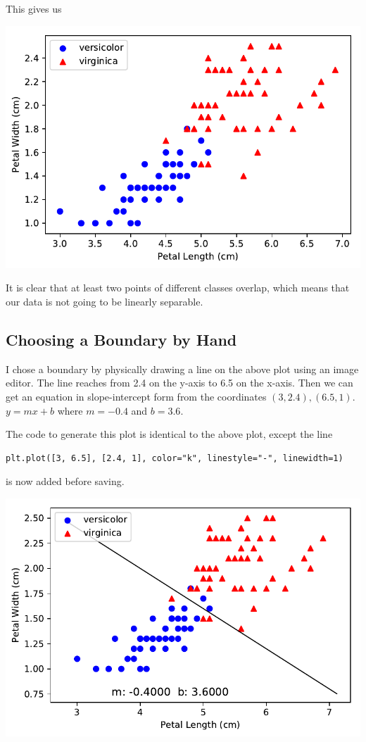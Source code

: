 \documentclass[letterpaper]{article}
\begin{document}
This gives us
\begin{center}
\includegraphics{plot_1a.pdf}
\end{center}
It is clear that at least two points of different classes overlap, which means
that our data is not going to be linearly separable.

\subsection{Choosing a Boundary by Hand}

I chose a boundary by physically drawing a line on the above plot using an
image editor. The line reaches from 2.4 on the y-axis to 6.5 on the x-axis.
Then we can get an equation in slope-intercept form from the coordinates
$(3, 2.4), (6.5, 1)$. $y=mx+b$ where $m=-0.4$ and $b=3.6$.

The code to generate this plot is identical to the above plot, except the line
\begin{verbatim}
plt.plot([3, 6.5], [2.4, 1], color="k", linestyle="-", linewidth=1)
\end{verbatim}
is now added before saving.
\begin{center}
\includegraphics{plot_1b.pdf}
\end{center}
\end{document}
